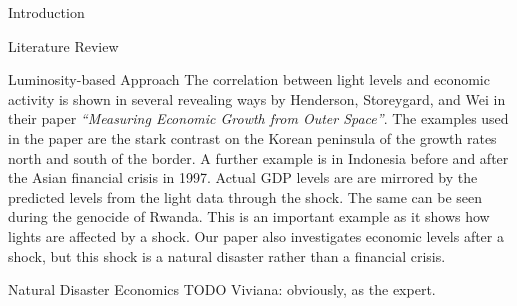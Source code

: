 \documentclass[12pt,fleqn,leqno,letterpaper]{article}
\begin{document}
\begin{section}{Introduction}
\begin{subsection}{Literature Review}
\begin{subsubsection}{Luminosity-based Approach}
      The correlation between light levels and economic activity is shown in several revealing ways by Henderson, Storeygard, and Wei in their paper \textit{``Measuring Economic Growth from Outer Space''}. The examples used in the paper are the stark contrast on the Korean peninsula of the growth rates north and south of the border. A further example is in Indonesia before and after the Asian financial crisis in 1997. Actual GDP levels are are mirrored by the predicted levels from the light data through the shock. The same can be seen during the genocide of Rwanda. This is an important example as it shows how lights are affected by a shock. Our paper also investigates economic levels after a shock, but this shock is a natural disaster rather than a financial crisis.
    \end{subsubsection}
    \begin{subsubsection}{Natural Disaster Economics}
      TODO Viviana: obviously, as the expert.
    \end{subsubsection}
  \end{subsection}
\end{section}
\end{document}

